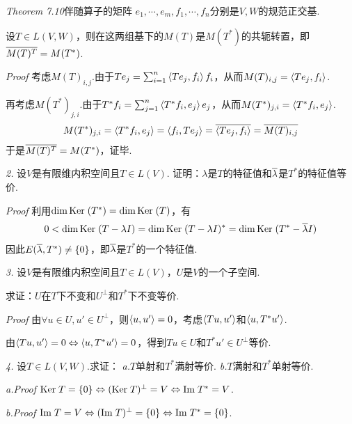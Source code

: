 \textit{Theorem 7.10}{\kaishu 伴随算子的矩阵}
\(e_1,\cdots,e_m,f_1,\cdots,f_n\)分别是\(V,W\)的规范正交基.

设\(T \in L(V,W)\)，则在这两组基下的\(M(T)\)是\(M(T^*)\)的共轭转置，即\(\overline{M(T)^T}=M(T^*)\).

\textit{Proof}
考虑\(M(T)_{i,j}\).由于\(Te_j=\sum_{i=1}^n \left\langle Te_j,f_i \right\rangle f_i\)，从而\(M(T)_{i,j}=\left\langle Te_j,f_i \right\rangle\).

再考虑\(M(T^*)_{j,i}\).由于\(T^*f_i=\sum_{j=1}^n \left\langle T^*f_i,e_j \right\rangle e_j\)，从而\(M(T^*)_{j,i}=\left\langle T^*f_i,e_j \right\rangle\).
    \begin{align*}
        M(T^*)_{j,i}=\left\langle T^*f_i,e_j \right\rangle=\left\langle f_i,Te_j \right\rangle=\overline{\left\langle Te_j,f_i \right\rangle}=\overline{M(T)_{i,j}}
    \end{align*}
于是\(\overline{M(T)^T}=M(T^*)\)，证毕.

\hspace*{\fill}

\textit{2.}
设\(V\)是有限维内积空间且\(T \in L(V)\).
证明：\(\lambda\)是\(T\)的特征值和\(\overline{\lambda}\)是\(T^*\)的特征值等价.

\textit{Proof}
利用\(\dim \mathrm{Ker \;}(T^*)=\dim \mathrm{Ker \;}(T)\)，有
    \begin{align*}
        0<\dim \mathrm{Ker \;}(T-\lambda I)=\dim \mathrm{Ker \;}(T-\lambda I)^*=\dim \mathrm{Ker \;}(T^*-\overline{\lambda}I)
    \end{align*}
因此\(E(\overline{\lambda},T^*) \ne \{0\}\)，即\(\overline{\lambda}\)是\(T^*\)的一个特征值.

\hspace*{\fill}

\textit{3.}
设\(V\)是有限维内积空间且\(T \in L(V)\)，\(U\)是\(V\)的一个子空间.

求证：\(U\)在\(T\)下不变和\(U^\bot\)和\(T^*\)下不变等价.

\textit{Proof}
由\(\forall u \in U,u' \in U^\bot\)，则\(\left\langle u,u' \right\rangle=0\)，考虑\(\left\langle Tu,u' \right\rangle\)和\(\left\langle u,T^*u' \right\rangle\).

由\(\left\langle Tu,u' \right\rangle=0 \Leftrightarrow \left\langle u,T^*u' \right\rangle=0\)，得到\(Tu \in U\)和\(T^*u' \in U^\bot\)等价.

\hspace*{\fill}

\textit{4.}
设\(T \in L(V,W)\).求证：
\textit{a.}\(T\)单射和\(T^*\)满射等价. \quad \textit{b.}\(T\)满射和\(T^*\)单射等价.

\textit{a.Proof}
\(\mathrm{Ker \;} T=\{0\} \Leftrightarrow (\mathrm{Ker \;} T)^\bot=V \Leftrightarrow \mathrm{Im \;} T^*=V\).

\textit{b.Proof}
\(\mathrm{Im \;} T=V \Leftrightarrow (\mathrm{Im \;} T)^\bot=\{0\} \Leftrightarrow \mathrm{Im \;} T^*=\{0\}\).

